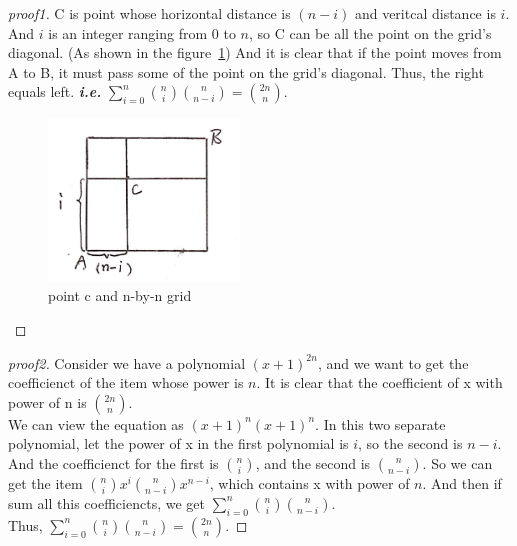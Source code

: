 \documentclass{article}
\begin{document}
\begin{enumerate}
\begin{enumerate}
\begin{proof}[proof1]
                C is point whose horizontal distance is $(n - i)$ and veritcal distance is $i$. And $i$ is an integer ranging from 0 to $n$,
                so C can be all the point on the grid's diagonal. (As shown in the figure~\ref{fig:Drawing})
                And it is clear that if the point moves from A to B, it must pass some of the point on the grid's diagonal. Thus, the right equals left.
                \textbf{\textit{i.e.}} $\sum_{i = 0}^n \binom{n}{i} \binom{n}{n - i} = \binom{2n}{n}$.
                    \begin{figure}
                        \includegraphics[width=2in]{Drawing}
                        \centering
                        \caption{point c and n-by-n grid}
                        \label{fig:Drawing}
                    \end{figure}
            \end{proof}

            \begin{proof}[proof2]
                Consider we have a polynomial $(x + 1) ^ {2n}$,
                and we want to get the coefficienct of the item whose power is $n$. It is clear that the coefficient of x with power of n is $\binom{2n}{n}$.\\
                We can view the equation as $(x + 1) ^ n (x + 1) ^n $.
                In this two separate polynomial, let the power of x in the first polynomial is $i$, so the second is $n - i$.
                And the coefficienct for the first is $\binom{n}{i}$, and the second is $\binom{n}{n - i}$.
                So we can get the item $\binom{n}{i}x^i \binom{n}{n - i}x^{n - i}$, which contains x with power of $n$.
                And then if sum all this coefficiencts, we get $\sum_{i = 0}^n \binom{n}{i} \binom{n}{n - i}$.\\
                Thus, $\sum_{i = 0}^n \binom{n}{i} \binom{n}{n - i} = \binom{2n}{n}$. 
            \end{proof}
        \end{enumerate}
        
    \end{enumerate}
\end{document}
